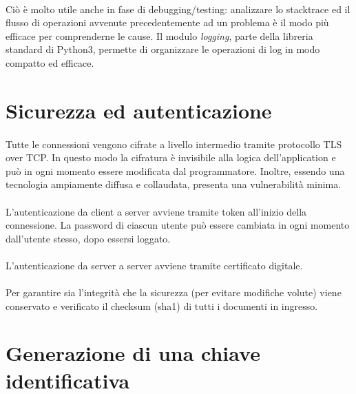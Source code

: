 \documentclass[11pt,a4paper,english]{article}
\begin{document}
\paragraph{} Ciò è molto utile anche in fase di debugging/testing: analizzare lo stacktrace ed il flusso di operazioni avvenute precedentemente ad un problema è il modo più efficace per comprenderne le cause. Il modulo \emph{logging}, parte della libreria standard di Python3, permette di organizzare le operazioni di log in modo compatto ed efficace. 


\section{Sicurezza ed autenticazione}

\paragraph{} Tutte le connessioni vengono cifrate a livello intermedio tramite protocollo TLS over TCP. In questo modo la cifratura è invisibile alla logica dell'application e può in ogni momento essere modificata dal programmatore. Inoltre, essendo una tecnologia ampiamente diffusa e collaudata, presenta una vulnerabilità minima. 

\paragraph{} L'autenticazione da client a server avviene tramite token all'inizio della connessione. La password di ciascun utente può essere cambiata in ogni momento dall'utente stesso, dopo essersi loggato. 

\paragraph{} L'autenticazione da server a server avviene tramite certificato digitale.

\paragraph{} Per garantire sia l'integrità che la sicurezza (per evitare modifiche volute) viene conservato e verificato il checksum (sha1) di tutti i documenti in ingresso. 


\section{Generazione di una chiave identificativa}
\end{document}
